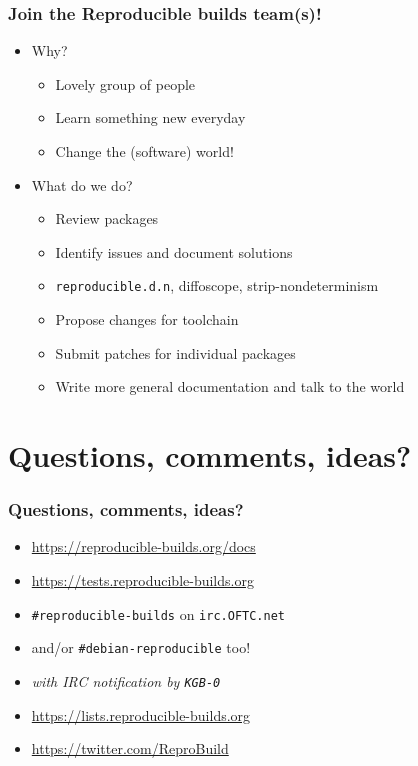 \documentclass[14pt]{beamer}
\begin{document}
\begin{frame}
 \frametitle{Join the Reproducible builds team(s)!}

 \begin{itemize}
  \item Why?
   \begin{itemize}
    \item \heartsuit{}\heartsuit{}\heartsuit{} Lovely group of people \heartsuit{}\heartsuit{}\heartsuit{}
    \item Learn something new everyday
    \item Change the (software) world!
   \end{itemize}
  \item What do we do?
   \begin{itemize}
    \item Review packages
    \item Identify issues and document solutions
    \item \texttt{reproducible.d.n}, diffoscope, strip-nondeterminism
    \item Propose changes for toolchain
    \item Submit patches for individual packages
    \item Write more general documentation and talk to the world
   \end{itemize}
 \end{itemize}
\end{frame}


\section{Questions, comments, ideas?}


\begin{frame}
 \frametitle{Questions, comments, ideas?}

 \begin{itemize}
  \item<2-3> \url{https://reproducible-builds.org/docs}
  \item<2-3> \url{https://tests.reproducible-builds.org}
  \item<2-3> \texttt{\#reproducible-builds} on \texttt{irc.OFTC.net}
  \item<2-3> \small{and/or \texttt{\#debian-reproducible} too!}
  \item<2-3> \small\it{with IRC notification by \texttt{KGB-0}}
  \item<3> \url{https://lists.reproducible-builds.org}
  \item<3> \url{https://twitter.com/ReproBuild}
  \end{itemize}
\end{frame}
\end{document}
